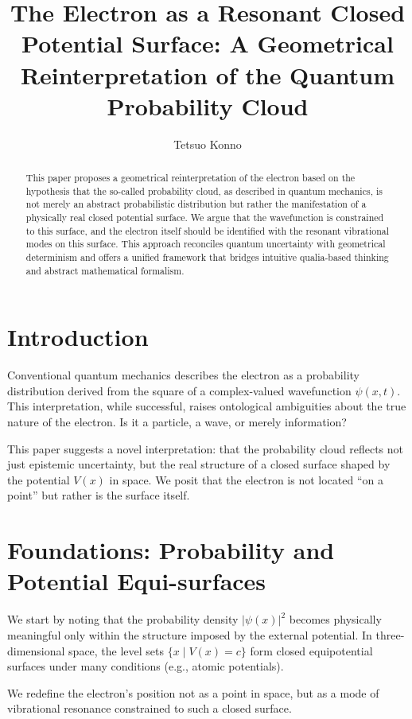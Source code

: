 \documentclass[12pt]{article}
\title{The Electron as a Resonant Closed Potential Surface: A Geometrical Reinterpretation of the Quantum Probability Cloud}
\author{Tetsuo Konno}
\date{}
\begin{document}
\maketitle

\begin{abstract}
This paper proposes a geometrical reinterpretation of the electron based on the hypothesis that the so-called probability cloud, as described in quantum mechanics, is not merely an abstract probabilistic distribution but rather the manifestation of a physically real closed potential surface. We argue that the wavefunction is constrained to this surface, and the electron itself should be identified with the resonant vibrational modes on this surface. This approach reconciles quantum uncertainty with geometrical determinism and offers a unified framework that bridges intuitive qualia-based thinking and abstract mathematical formalism.
\end{abstract}

\section{Introduction}
Conventional quantum mechanics describes the electron as a probability distribution derived from the square of a complex-valued wavefunction $\psi(x, t)$. This interpretation, while successful, raises ontological ambiguities about the true nature of the electron. Is it a particle, a wave, or merely information?

This paper suggests a novel interpretation: that the probability cloud reflects not just epistemic uncertainty, but the real structure of a closed surface shaped by the potential $V(x)$ in space. We posit that the electron is not located ``on a point'' but rather is the surface itself.

\section{Foundations: Probability and Potential Equi-surfaces}
We start by noting that the probability density $|\psi(x)|^2$ becomes physically meaningful only within the structure imposed by the external potential. In three-dimensional space, the level sets $\{x \mid V(x) = c\}$ form closed equipotential surfaces under many conditions (e.g., atomic potentials).

We redefine the electron's position not as a point in space, but as a mode of vibrational resonance constrained to such a closed surface.
\end{document}
